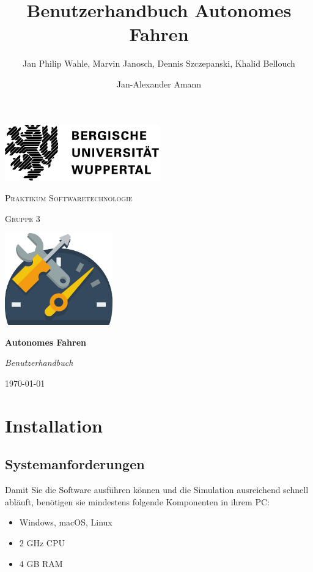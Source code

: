 \documentclass[11pt,a4paper]{article}
\date{}
\author{Jan Philip Wahle, Marvin Janosch, Dennis Szczepanski, Khalid Bellouch
        \and Jan-Alexander Amann}
\title{Benutzerhandbuch Autonomes Fahren}
\begin{document}
\begin{titlepage}
	\centering
	\includegraphics[width=0.5\textwidth]{uni.png}\par\vspace{1cm}
	{\scshape\LARGE Praktikum Softwaretechnologie\par}
	\vspace{1cm}
	{\scshape\Large Gruppe 3\par}
	\vspace{1.5cm}
	\begin{center}
		\includegraphics[width=0.35\textwidth]{icon}
	\end{center}
	{\huge\bfseries Autonomes Fahren\par}
	\vspace{2cm}
	{\Large\itshape Benutzerhandbuch\par}

	\vfill

	{\large \today\par}
\end{titlepage}

\tableofcontents

\newpage

\section{Installation}

\subsection{Systemanforderungen}
Damit Sie die Software ausführen können und die Simulation ausreichend schnell abläuft, benötigen sie mindestens folgende Komponenten in ihrem PC:
\begin{itemize}
\item Windows, macOS, Linux
\item 2 GHz CPU
\item 4 GB RAM
\end{itemize}
\end{document}
